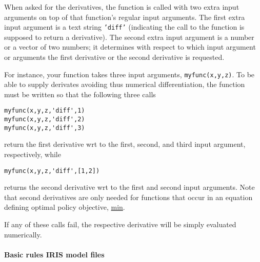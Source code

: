 When asked for the derivatives, the function is called with two extra
input arguments on top of that function's regular input arguments. The
first extra input argument is a text string \texttt{'diff'} (indicating
the call to the function is supposed to return a derivative). The second
extra input argument is a number or a vector of two numbers; it
determines with respect to which input argument or arguments the first
derivative or the second derivative is requested.

For instance, your function takes three input arguments,
\texttt{myfunc(x,y,z)}. To be able to supply derivates avoiding thus
numerical differentiation, the function must be written so that the
following three calls

\begin{verbatim}
myfunc(x,y,z,'diff',1)
myfunc(x,y,z,'diff',2)
myfunc(x,y,z,'diff',3)
\end{verbatim}

return the first derivative wrt to the first, second, and third input
argument, respectively, while

\begin{verbatim}
myfunc(x,y,z,'diff',[1,2])
\end{verbatim}

returns the second derivative wrt to the first and second input
arguments. Note that second derivatives are only needed for functions
that occur in an equation defining optimal policy objective,
\href{modellang/min}{min}.

If any of these calls fail, the respective derivative will be simply
evaluated numerically.

\paragraph{Basic rules IRIS model
files}

